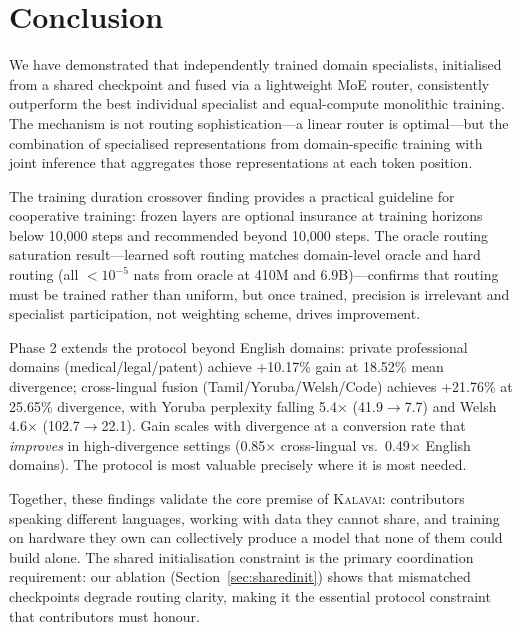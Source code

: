 \documentclass{article}
\newcommand{\kalavai}{\textsc{Kalavai}\xspace}
\begin{document}
\section{Conclusion}
\label{sec:conclusion}

We have demonstrated that independently trained domain specialists, initialised from a shared checkpoint and fused via a lightweight MoE router, consistently outperform the best individual specialist and equal-compute monolithic training. The mechanism is not routing sophistication---a linear router is optimal---but the combination of specialised representations from domain-specific training with joint inference that aggregates those representations at each token position.

The training duration crossover finding provides a practical guideline for cooperative training: frozen layers are optional insurance at training horizons below 10,000 steps and recommended beyond 10,000 steps. The oracle routing saturation result---learned soft routing matches domain-level oracle and hard routing (all ${<}10^{-5}$ nats from oracle at 410M and 6.9B)---confirms that routing must be trained rather than uniform, but once trained, precision is irrelevant and specialist participation, not weighting scheme, drives improvement.

Phase 2 extends the protocol beyond English domains: private professional domains (medical/legal/patent) achieve +10.17\% gain at 18.52\% mean divergence; cross-lingual fusion (Tamil/Yoruba/Welsh/Code) achieves +21.76\% at 25.65\% divergence, with Yoruba perplexity falling 5.4$\times$ (41.9$\to$7.7) and Welsh 4.6$\times$ (102.7$\to$22.1). Gain scales with divergence at a conversion rate that \emph{improves} in high-divergence settings (0.85$\times$ cross-lingual vs.\ 0.49$\times$ English domains). The protocol is most valuable precisely where it is most needed.

Together, these findings validate the core premise of \kalavai: contributors speaking different languages, working with data they cannot share, and training on hardware they own can collectively produce a model that none of them could build alone. The shared initialisation constraint is the primary coordination requirement: our ablation (Section~\ref{sec:sharedinit}) shows that mismatched checkpoints degrade routing clarity, making it the essential protocol constraint that contributors must honour.
\end{document}
